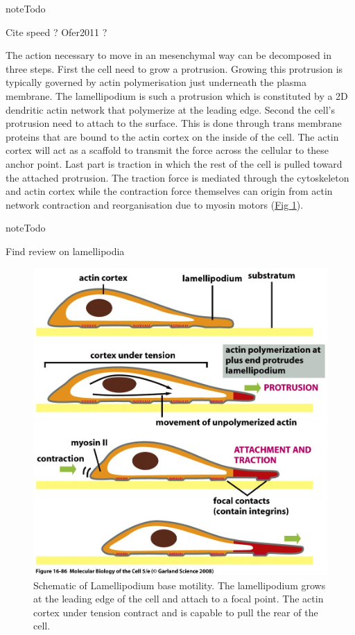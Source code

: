 \documentclass[A4paperpaper,11pt,english]{sphinxmanual}
\begin{document}
\begin{notice}{note}{Todo}

Cite speed ? Ofer2011 ?
\end{notice}

The action necessary to move in an mesenchymal way can be decomposed in three
steps. First the cell need to grow a protrusion. Growing this protrusion is
typically governed by actin polymerisation just underneath the plasma membrane. The
lamellipodium is such a protrusion which is constituted by a 2D dendritic actin network
that polymerize at the leading edge. Second the cell's protrusion
need to attach to the surface. This is done through trans membrane proteins
that are bound to the actin cortex on the inside of the cell. The actin cortex
will act as a scaffold to transmit the force across the cellular to these
anchor point. Last part is traction in which the rest of the cell is pulled
toward the attached protrusion. The traction force is mediated through the
cytoskeleton and actin cortex while the contraction force themselves can origin
from actin network contraction and reorganisation due to myosin motors (\hyperref[parts/part1:fig-lam-principle]{Fig  \ref*{parts/part1:fig-lam-principle}}).

\begin{notice}{note}{Todo}

Find review on lamellipodia
\end{notice}
\begin{figure}[htbp]
\centering
\capstart

\includegraphics[width=0.600\linewidth]{figure-16-86.jpg}
\caption{Schematic of Lamellipodium base motility. The lamellipodium grows at the
leading edge of the cell and attach to a focal point. The actin cortex
under tension contract and is capable to pull the rear of the cell.}\label{parts/part1:fig-lam-principle}\end{figure}
\end{document}
